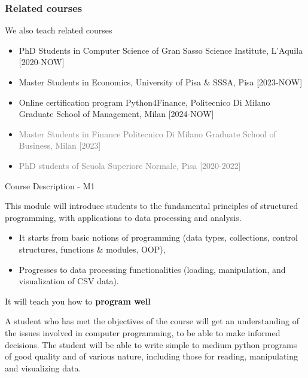 \documentclass{beamer}%
\begin{document}
\begin{frame}
	\frametitle{Related courses}
	We also teach related courses
		\begin{itemize}
			\item PhD Students in Computer Science of Gran Sasso Science Institute, L'Aquila [2020-NOW]
			\item Master Students in Economics, University of Pisa \& SSSA, Pisa [2023-NOW]
			\item Online certification program Python4Finance,  Politecnico Di Milano Graduate School of Management, Milan [2024-NOW]
			\item \textcolor{gray}{Master Students in Finance Politecnico Di Milano Graduate School of Business, Milan [2023]}
			\item \textcolor{gray}{PhD students of Scuola Superiore Normale, Pisa [2020-2022]}
		\end{itemize}
\end{frame}



\begin{frame}{Course Description - M1}
\begin{block}{This module will }
introduce students to the fundamental principles of structured programming, with applications to data processing and analysis. 
\begin{itemize}
	\item It starts from basic notions of programming (data types, collections, control structures, functions \& modules, OOP),
	\item Progresses to data processing functionalities (loading, manipulation, and visualization of CSV data).
\end{itemize}
It will teach you how to \textbf{program well}
\end{block}

\pause

\begin{block}{A student who has met the objectives of the course will get}
an understanding of the issues involved in computer programming, to be able to make informed decisions. The student will be able to write simple to medium python programs of good quality and of various nature, including those for reading, manipulating and visualizing data. %
\end{block}
\end{frame}
\end{document}
